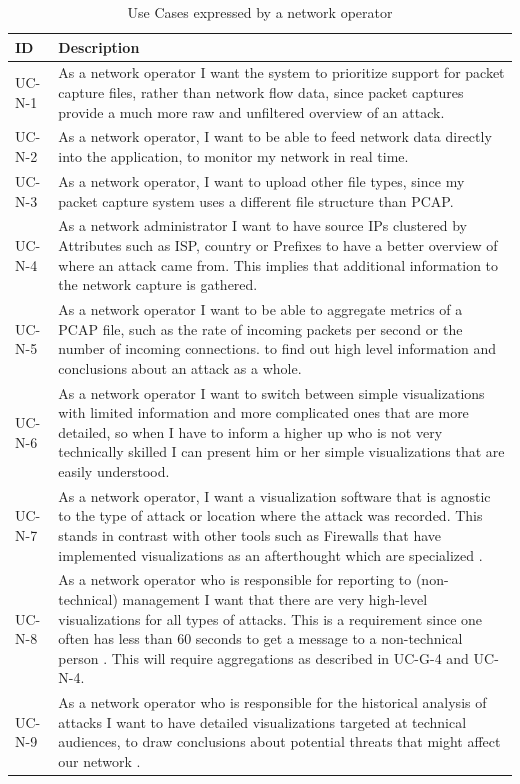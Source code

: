 \begin{table}[]
\centering
\begin{tabular}{|p{1.6cm}|p{12cm}|}
\hline
\textbf{ID} & \textbf{Description} \\ \hline

UC-N-1         & As a network operator I want the system to prioritize support for packet capture files, rather than network flow data, since packet captures provide a much more raw and unfiltered overview of an attack. \\ \hline
UC-N-2        & As a network operator, I want to be able to feed network data directly into the application, to monitor my network in real time.\\ \hline
UC-N-3        & As a network operator, I want to upload other file types, since my packet capture system uses a different file structure than PCAP.\\ \hline
UC-N-4        & As a network administrator I want to have source IPs clustered by Attributes such as ISP, country or Prefixes to have a better overview of where an attack came from. This implies that additional information to the network capture is gathered.\\ \hline
UC-N-5         & As a network operator I want to be able to aggregate metrics of a PCAP file, such as the rate of incoming packets per second or the number of incoming connections. to find out high level information and conclusions about an attack as a whole.\\ \hline
UC-N-6        & As a network operator I want to switch between simple visualizations with limited information and more complicated ones that are more detailed, so when I have to inform a higher up who is not very technically skilled I can present him or her simple visualizations that are easily understood.\\ \hline
UC-N-7       & As a network operator, I want a visualization software that is agnostic to the type of attack or location where the attack was recorded. This stands in contrast with other tools such as Firewalls that have implemented visualizations as an afterthought which are specialized \cite{appliedsecurityvisualization}.\\ \hline
UC-N-8       & As a network operator who is responsible for reporting to (non-technical) management I want that there are very high-level visualizations for all types of attacks. This is a requirement since one often has less than 60 seconds to get a message to a non-technical person \cite{appliedsecurityvisualization}. This will require aggregations as described in UC-G-4 and UC-N-4. \\ \hline
UC-N-9       & As a network operator who is responsible for the historical analysis of attacks I want to have detailed visualizations targeted at technical audiences, to draw conclusions about potential threats that might affect our network \cite{appliedsecurityvisualization}.\\ \hline

\end{tabular}
\caption{Use Cases expressed by a network operator}
\label{table:us-operator}
\end{table} 

